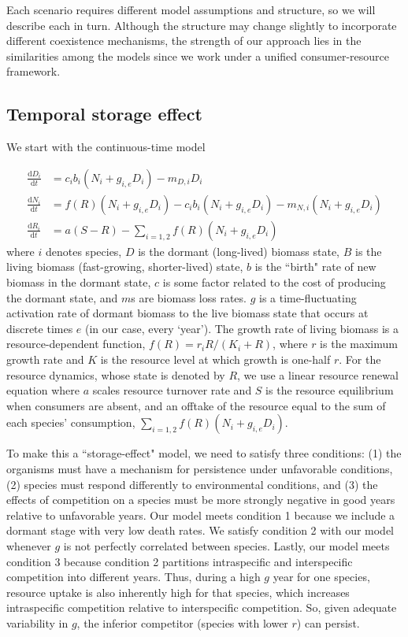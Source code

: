 \documentclass[12pt]{article}
\begin{document}
Each scenario requires different model assumptions and structure, so we will describe each in turn. Although the structure may change slightly to incorporate different coexistence mechanisms, the strength of our approach lies in the similarities among the models since we work under a unified consumer-resource framework.

\subsection{Temporal storage effect}
We start with the continuous-time model

\begin{align}
\frac{\text{d}D_{i}}{\text{d}t} &= c_{i}b_{i}(N_{i} + g_{i,e}D_{i}) - m_{D,i}D_{i}\\
\frac{\text{d}N_{i}}{\text{d}t} &= f(R)(N_{i} + g_{i,e}D_{i}) - c_{i}b_{i}(N_{i} + g_{i,e}D_{i})  - m_{N,i}(N_{i}+g_{i,e}D_{i})\\
\frac{\text{d}R_{i}}{\text{d}t} &= a(S - R) - \sum\limits_{i=1,2}f(R)(N_{i}+g_{i,e}D_{i})
\end{align}
where $i$ denotes species, $D$ is the dormant (long-lived) biomass state, $B$ is the living biomass (fast-growing, shorter-lived) state, $b$ is the ``birth" rate of new biomass in the dormant state, $c$ is some factor related to the cost of producing the dormant state, and $m$s are biomass loss rates. $g$ is a time-fluctuating activation rate of dormant biomass to the live biomass state that occurs at discrete times $e$ (in our case, every `year'). The growth rate of living biomass is a resource-dependent function, $f(R) = r_{i}R/(K_{i}+R)$, where $r$ is the maximum growth rate and $K$ is the resource level at which growth is one-half $r$. For the resource dynamics, whose state is denoted by $R$, we use a linear resource renewal equation where $a$ scales resource turnover rate and $S$ is the resource equilibrium when consumers are absent, and an offtake of the resource equal to the sum of each species' consumption, $\sum_{i=1,2}f(R)(N_{i}+g_{i,e}D_{i})$.

To make this a ``storage-effect" model, we need to satisfy three conditions: (1) the organisms must have a mechanism for persistence under unfavorable conditions, (2) species must respond differently to environmental conditions, and (3) the effects of competition on a species must be more strongly negative in good years relative to unfavorable years. Our model meets condition 1 because we include a dormant stage with very low death rates. We satisfy condition 2 with our model whenever $g$ is not perfectly correlated between species. Lastly, our model meets condition 3 because condition 2 partitions intraspecific and interspecific competition into different years. Thus, during a high $g$ year for one species, resource uptake is also inherently high for that species, which increases intraspecific competition relative to interspecific competition. So, given adequate variability in $g$, the inferior competitor (species with lower $r$) can persist.  
\end{document}
